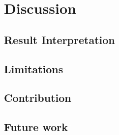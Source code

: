 \chapter{Discussion}

\section{Result Interpretation}
\par \blindtext

\par \blindtext

\section{Limitations}
\par \blindtext

\par \blindtext



\section{Contribution}
\blindtext

\section{Future work}
\blindtext